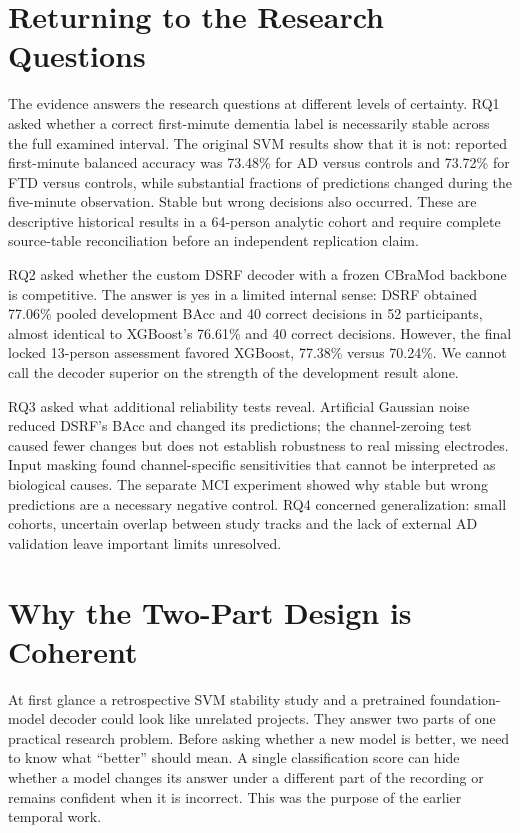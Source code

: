 \section{Returning to the Research Questions}
The evidence answers the research questions at different levels of certainty. RQ1 asked whether a correct first-minute dementia label is necessarily stable across the full examined interval. The original SVM results show that it is not: reported first-minute balanced accuracy was 73.48\% for AD versus controls and 73.72\% for FTD versus controls, while substantial fractions of predictions changed during the five-minute observation. Stable but wrong decisions also occurred. These are descriptive historical results in a 64-person analytic cohort and require complete source-table reconciliation before an independent replication claim.

RQ2 asked whether the custom DSRF decoder with a frozen CBraMod backbone is competitive. The answer is yes in a limited internal sense: DSRF obtained 77.06\% pooled development BAcc and 40 correct decisions in 52 participants, almost identical to XGBoost's 76.61\% and 40 correct decisions. However, the final locked 13-person assessment favored XGBoost, 77.38\% versus 70.24\%. We cannot call the decoder superior on the strength of the development result alone.

RQ3 asked what additional reliability tests reveal. Artificial Gaussian noise reduced DSRF's BAcc and changed its predictions; the channel-zeroing test caused fewer changes but does not establish robustness to real missing electrodes. Input masking found channel-specific sensitivities that cannot be interpreted as biological causes. The separate MCI experiment showed why stable but wrong predictions are a necessary negative control. RQ4 concerned generalization: small cohorts, uncertain overlap between study tracks and the lack of external AD validation leave important limits unresolved.

\section{Why the Two-Part Design is Coherent}
At first glance a retrospective SVM stability study and a pretrained foundation-model decoder could look like unrelated projects. They answer two parts of one practical research problem. Before asking whether a new model is better, we need to know what ``better'' should mean. A single classification score can hide whether a model changes its answer under a different part of the recording or remains confident when it is incorrect. This was the purpose of the earlier temporal work.

